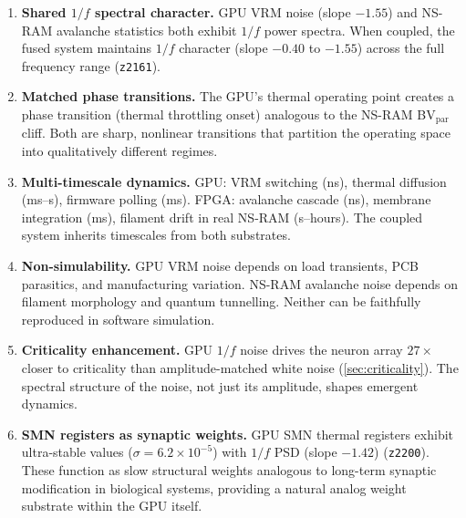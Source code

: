 \documentclass[11pt]{article}
\newcommand{\expt}[1]{\texttt{z#1}}
\begin{document}
\begin{enumerate}[leftmargin=1.5em, itemsep=2pt]

  \item \textbf{Shared $1/f$ spectral character.}
    GPU VRM noise (slope $-1.55$) and NS-RAM avalanche
    statistics both exhibit $1/f$ power spectra.  When coupled,
    the fused system maintains $1/f$ character (slope $-0.40$
    to $-1.55$) across the full frequency range (\expt{2161}).

  \item \textbf{Matched phase transitions.}
    The GPU's thermal operating point creates a phase transition
    (thermal throttling onset) analogous to the NS-RAM BV$_\text{par}$
    cliff.  Both are sharp, nonlinear transitions that partition
    the operating space into qualitatively different regimes.

  \item \textbf{Multi-timescale dynamics.}
    GPU: VRM switching (ns), thermal diffusion (ms--s), firmware
    polling (ms).  FPGA: avalanche cascade (ns), membrane
    integration (ms), filament drift in real NS-RAM (s--hours).
    The coupled system inherits timescales from both substrates.

  \item \textbf{Non-simulability.}
    GPU VRM noise depends on load transients, PCB parasitics,
    and manufacturing variation.  NS-RAM avalanche noise depends
    on filament morphology and quantum tunnelling.  Neither
    can be faithfully reproduced in software simulation.

  \item \textbf{Criticality enhancement.}
    GPU $1/f$ noise drives the neuron array $27\times$ closer
    to criticality than amplitude-matched white noise
    (\cref{sec:criticality}).  The spectral structure of the
    noise, not just its amplitude, shapes emergent dynamics.

  \item \textbf{SMN registers as synaptic weights.}
    GPU SMN thermal registers exhibit ultra-stable values
    ($\sigma = 6.2 \times 10^{-5}$) with $1/f$ PSD
    (slope $-1.42$) (\expt{2200}).  These function as
    slow structural weights analogous to long-term synaptic
    modification in biological systems, providing a natural
    analog weight substrate within the GPU itself.

\end{enumerate}


\end{document}
